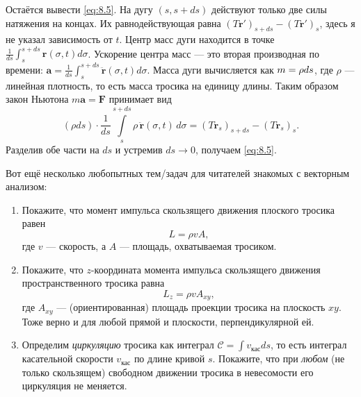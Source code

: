 Остаётся вывести \eqref{eq:8.5}.
На дугу $(s, s+ds)$ действуют только две силы натяжения на концах.
Их равнодействующая равна
$(T \mathbf{r}')_{s+ds} - (T \mathbf{r}')_s$,
здесь я не указал зависимость от $t$.
Центр масс дуги находится в точке $
\tfrac{1}{ds} \int_s^{s+ds} \mathbf{r}(\sigma, t) d\sigma$.
Ускорение центра масс --- это вторая производная по времени:
$\mathbf{a}=\tfrac{1}{ds} \int_s^{s+ds} \ddot{\mathbf{r}}(\sigma, t) d\sigma$.
Масса дуги вычисляется как $m \z= \rho ds$, где $\rho$ --- линейная плотность, то есть масса тросика на единицу длины.
Таким образом закон Ньютона $m\mathbf{a}=\mathbf{F}$ принимает вид
\begin{equation}
(\rho ds)
\cdot
\frac{1}{ds}
\int\limits_s^{s+ds}
\rho\,\ddot{\mathbf{r}}(\sigma, t)\, d\sigma
= (T \mathbf{r}_s)_{s+ds} - (T \mathbf{r}_s)_s .
\end{equation}
Разделив обе части на $ds$ и устремив $ds \to 0$, получаем \eqref{eq:8.5}.

\medskip

Вот ещё несколько любопытных тем/задач для читателей знакомых с векторным анализом:

\begin{enumerate}
\item Покажите, что момент импульса скользящего движения плоского тросика равен
\begin{equation}
L=\rho v A ,
\end{equation}
где $v$ --- скорость, а $A$ --- площадь, охватываемая тросиком.
\item Покажите, что $z$-координата момента импульса скользящего движения пространственного тросика равна
\begin{equation}
L_z=\rho v A_{xy},
\end{equation}
где $A_{xy}$ --- (ориентированная) площадь проекции тросика на плоскость $xy$.
Тоже верно и для любой прямой и плоскости, перпендикулярной ей.
\item Определим \emph{циркуляцию} тросика как интеграл
$\mathcal{C}=\int v_{\text{кас}} ds$,
то есть интеграл касательной скорости $v_{\text{кас}}$ по длине кривой $s$.
Покажите, что при \emph{любом} (не только скользящем) свободном движении тросика в невесомости
его циркуляция не меняется.
\end{enumerate}

